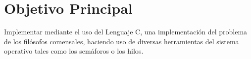 \section{Objetivo Principal} \label{sec:Objetivos}
Implementar mediante el uso del Lenguaje C, una implementación del problema de los filósofos comensales, haciendo uso de diversas herramientas del sistema operativo tales como los semáforos o los hilos.